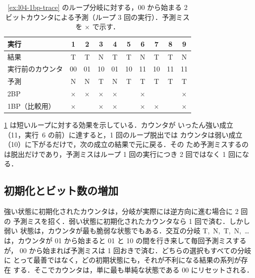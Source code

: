 \documentclass[../main.tex]{subfiles}
\begin{document}
\begin{table}[htbp]
  \centering\small
  \caption{\cref{ex:l04-1bp-trace} のループ分岐に対する，00 から始まる
    2 ビットカウンタによる予測（ループ 3 回の実行）．予測ミスを $\times$
    で示す．}
  \label{tab:l04-2bc-trace}
  \setlength{\tabcolsep}{4.5pt}
  \begin{tabular}{@{}lccccccccc@{}}
    \toprule
    実行              & 1 & 2 & 3 & 4 & 5 & 6 & 7 & 8 & 9 \\
    \midrule
    結果              & T & T & N & T & T & N & T & T & N \\
    実行前のカウンタ  & 00 & 01 & 10 & 01 & 10 & 11 & 10 & 11 & 11 \\
    予測              & N & N & T & N & T & T & T & T & T \\
    2BP               & $\times$ & $\times$ & $\times$ & $\times$ & & $\times$ & & & $\times$ \\
    1BP（比較用）     & $\times$ & & $\times$ & $\times$ & & $\times$ & $\times$ & & $\times$ \\
    \bottomrule
  \end{tabular}
\end{table}

\cref{tab:l04-2bc-trace} は短いループに対する効果を示している．カウンタが
いったん強い成立（11，実行~6 の前）に達すると，1 回のループ脱出では
カウンタは弱い成立（10）に下がるだけで，次の成立の結果で元に戻る．その
ため予測ミスするのは脱出だけであり，予測ミスはループ 1 回の実行につき
2 回ではなく 1 回になる．

\subsection{初期化とビット数の増加}

強い状態に初期化されたカウンタは，分岐が実際には逆方向に進む場合に 2 回の
予測ミスを招く．弱い状態に初期化されたカウンタなら 1 回で済む．しかし弱い
状態は，カウンタが最も脆弱な状態でもある．交互の分岐 T,~N,~T,~N,~\ldots{}
は，カウンタが 01 から始まると 01 と 10 の間を行き来して毎回予測ミスするが，
00 から始まれば予測ミスは 1 回おきで済む．どちらの選択もすべての分岐に
とって最善ではなく，どの初期状態にも，それが不利になる結果の系列が存在
する．そこでカウンタは，単に最も単純な状態である 00 にリセットされる．
\end{document}
